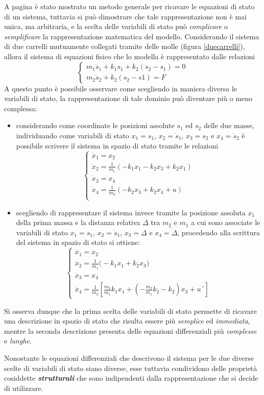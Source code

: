 		A pagina \pageref{sec:intro:metodogenerale} è stato mostrato un metodo generale per ricavare le equazioni di stato di un sistema, tuttavia si può dimostrare che tale rappresentazione non è mai unica, ma arbitraria, e la scelta delle variabili di stato può \textit{complicare} o \textit{semplificare} la rappresentazione matematica del modello. Considerando il sistema di due carrelli mutuamente collegati tramite delle molle (figura \ref{duecarrelli}), allora il sistema di equazioni fisico che lo modella è rappresentato dalle relazioni
		\[\begin{cases}
			m_1 \ddot s_1 + k_1s_1 + k_2(s_2-s_1) = 0 \\
			m_2\ddot s_2 + k_2(s_2-s1)=F
		\end{cases}\]
		A questo punto è possibile osservare come scegliendo in maniera diversa le variabili di stato, la rappresentazione di tale dominio può diventare più o meno complessa:
		\begin{itemize}
			\item considerando come coordinate le posizioni assolute $s_1$ ed $s_2$ delle due masse, individuando come variabili di stato $x_1 = s_1$, $x_2 = \dot s_1$, $x_3 = s_2$ e $x_4 = \dot s_2$ è possibile scrivere il sistema in spazio di stato tramite le relazioni
			\[ \begin{cases}
				\dot x_1 = x_2 \\ \dot x_2 = \frac 1 {m_1} (-k_1x_1-k_2x_3 + k_2x_1) \\
				\dot x_3 = x_4 \\ \dot x_4 = \frac 1 {m_2} (-k_2x_3 + k_2x_4 + u) \\
			\end{cases} \]
			\item scegliendo di rappresentare il sistema invece tramite la posizione assoluta $x_1$ della prima massa e la distanza relativa $\Delta$ tra $m_2$ e $m_1$ a cui sono associate le variabili di stato $x_1 = s_1$, $x_2 = \dot s_1$, $x_3 = \Delta$ e $x_4 = \dot \Delta$, procedendo alla scrittura del sistema in spazio di stato si ottiene:
			\[\begin{cases}
				\dot x_1 = x_2 \\
				\dot x_2 = \frac 1{m_1} \big(-k_1x_1+k_2x_3\big) \\
				\dot x_3 = x_4 \\
				\dot x_4 = \frac 1 {m_2} \left[\frac{m_2}{m_1}k_1x_1 + \left(-\frac{m_2}{m_1}k_2-k_2\right)x_3+u´\right]
			\end{cases}\]
		\end{itemize}
		Si osserva dunque che la prima scelta delle variabili di stato permette di ricavare una descrizione in spazio di stato che risulta essere più \textit{semplice} ed \textit{immediata}, mentre la seconda descrizione presenta delle equazioni differenziali più \textit{complesse} e \textit{lunghe}.
		\begin{osservazione}
			Nonostante le equazioni differenziali che descrivono il sistema per le due diverse scelte di variabili di stato siano diverse, esse tuttavia condividono delle proprietà cosiddette \textbf{\textit{strutturali}} che sono indipendenti dalla rappresentazione che si decide di utilizzare.
		\end{osservazione}
		
